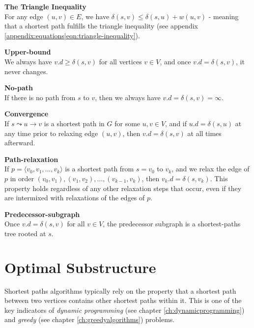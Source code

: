 \begin{description}
	\item \textbf{The Triangle Inequality} \cite[p.~671, thm. 24.10]{clrs} \\
For any edge $(u, v) \in E$, we have $\delta(s, v) \leq \delta(s, u) +
w(u, v)$ - meaning that a shortest path fulfills the triangle inequality (see
appendix \ref{appendix:equations|eqn:triangle-inequality}).

	\item \textbf{Upper-bound} \cite[p.~671-672, thm. 24.11]{clrs} \\
We always have $v.d \geq \delta(s, v)$ for all vertices $v \in V$, and once
$v.d = \delta(s, v)$, it never changes.

	\item \textbf{No-path} \cite[p.~672, thm. 24.12]{clrs} \\
If there is no path from $s$ to $v$, then we always have $v.d = \delta(s, v) =
\infty$.

	\item \textbf{Convergence} \cite[p.~672-673, thm. 24.14]{clrs} \\
If $s \leadsto u \rightarrow v$ is a shortest path in $G$ for some
$u, v \in V$, and if $u.d = \delta(s, u)$ at any time prior to relaxing edge
$(u, v)$, then $v.d = \delta(s,v)$ at all times afterward.
	\item \textbf{Path-relaxation} \cite[p.~673, thm. 24.15]{clrs} \\
If $p = \langle v_0, v_1, \dots, v_k \rangle$ is a shortest path from
$s = v_0$ to $v_k$, and we relax the edge of $p$ in order $(v_0, v_1),
(v_1, v_2), \dots, (v_{k-1}, v_k)$, then $v_k.d = \delta(s, v_k)$. This
property holds regardless of any other relaxation steps that occur, even if
they are intermixed with relaxations of the edges of $p$.
	\item \textbf{Predecessor-subgraph} \cite[p.~676, thm. 24.17]{clrs} \\
Once $v.d = \delta(s, v)$ for all $v \in V$, the predecessor subgraph is a
shortest-paths tree rooted at $s$.
\end{description}

\newpage
\section{Optimal Substructure}
Shortest paths algorithms typically rely on the property that a shortest path
between two vertices contains other shortest paths within it. This is one of
the key indicators of \textit{dynamic programming} (see chapter
\ref{ch:dynamicprogramming}) and \textit{greedy} (see chapter
\ref{ch:greedyalgorithms}) problems.

